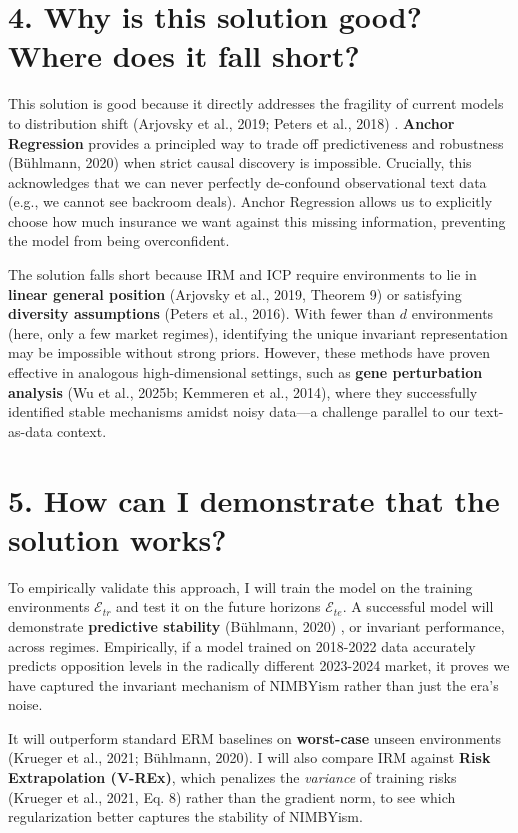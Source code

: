\documentclass[11pt]{article}
\begin{document}
\section*{4. Why is this solution good? Where does it fall short?}
This solution is good because it directly addresses the fragility of current models to distribution shift (Arjovsky et al., 2019; Peters et al., 2018) %
. \textbf{Anchor Regression} provides a principled way to trade off predictiveness and robustness (Bühlmann, 2020) %
when strict causal discovery is impossible.
    Crucially, this acknowledges that we can never perfectly de-confound observational text data (e.g., we cannot see backroom deals). Anchor Regression allows us to explicitly choose how much insurance we want against this missing information, preventing the model from being overconfident.

The solution falls short because IRM and ICP require environments to lie in \textbf{linear general position} (Arjovsky et al., 2019, Theorem 9) or satisfying \textbf{diversity assumptions} (Peters et al., 2016).
With fewer than $d$ environments (here, only a few market regimes), identifying the unique invariant representation may be impossible without strong priors. However, these methods have proven effective in analogous high-dimensional settings, such as \textbf{gene perturbation analysis} (Wu et al., 2025b; Kemmeren et al., 2014), where they successfully identified stable mechanisms amidst noisy data—a challenge parallel to our text-as-data context.

\section*{5. How can I demonstrate that the solution works?}
To empirically validate this approach, I will train the model on the training environments $\mathcal{E}_{tr}$ and test it on the future horizons $\mathcal{E}_{te}$. A successful model will demonstrate \textbf{predictive stability} (Bühlmann, 2020) %
, or invariant performance, across regimes.
    Empirically, if a model trained on 2018-2022 data accurately predicts opposition levels in the radically different 2023-2024 market, it proves we have captured the invariant mechanism of NIMBYism rather than just the era's noise.

It will outperform standard ERM baselines on \textbf{worst-case} unseen environments (Krueger et al., 2021; Bühlmann, 2020).
I will also compare IRM against \textbf{Risk Extrapolation (V-REx)}, which penalizes the \textit{variance} of training risks (Krueger et al., 2021, Eq. 8) rather than the gradient norm, to see which regularization better captures the stability of NIMBYism.
\end{document}
